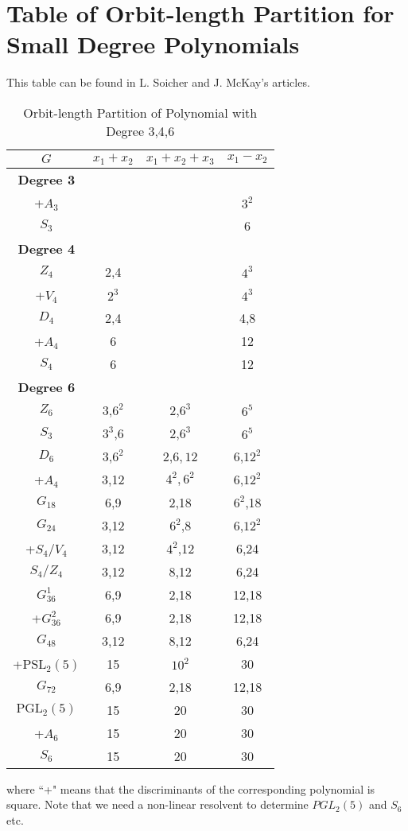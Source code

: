 \chapter{Table of Orbit-length Partition for Small Degree Polynomials}
\label{chap:appD}
This table can be found in L. Soicher and J. McKay's \citep{soicher1985computing} articles.

\begin{table}[htbp]
\centering
\begin{tabular}{cccc}
\hline
$G$ & $x_1+x_2$ & $x_1+x_2+x_3$ & $x_1-x_2$\\
\hline
\textbf{Degree 3} &  &  &  \\
+$A_3$ &  & & $3^2$\\
$S_3$ &  & & 6\\

\textbf{Degree 4} &  &  &  \\
$Z_4$ & 2,4  & & $4^3$\\
+$V_4$ & $2^3$  & & $4^3$\\
$D_4$ & 2,4  & & 4,8\\
+$A_4$ &6  & & 12\\
$S_4$ &6  & & 12\\

\textbf{Degree 6} &  &  &  \\
$Z_6$ & 3,$6^2$  &2,$6^3$ & $6^5$\\
$S_3$ & $3^3$,6  &2,$6^3$ & $6^5$\\
$D_6$ & 3,$6^2$  &2,$6,12$ & 6,$12^2$\\
+$A_4$ &3,12  &$4^2,6^2$ & 6,$12^2$\\
$G_{18}$ &6,9  &2,18 & $6^2$,18\\
$G_{24}$ & 3,12 &$6^2$,8 &6,$12^2$\\
+$S_4/V_4$ & 3,12&$4^2$,12&6,24\\
$S_4/Z_4$ & 3,12 &8,12&6,24\\
$G_{36}^1$ & 6,9 &2,18&12,18\\
+$G_{36}^2$ & 6,9 &2,18&12,18\\
$G_{48}$& 3,12 &8,12 &6,24\\
+$\text{PSL}_2(5)$ & 15 & $10^2$ & 30\\
$G_{72}$ & 6,9 &2,18&12,18\\
$\text{PGL}_2(5)$ & 15&20&30\\
+$A_6$ & 15&20&30\\
$S_6$ & 15&20&30\\
\hline
\end{tabular}
\caption{Orbit-length Partition of Polynomial with Degree 3,4,6}
\label{tab:allorbits}
\end{table}

where ``+" means that the discriminants of the corresponding polynomial is square. Note that we need a non-linear resolvent to determine $PGL_2(5)$ and $S_6$ etc.